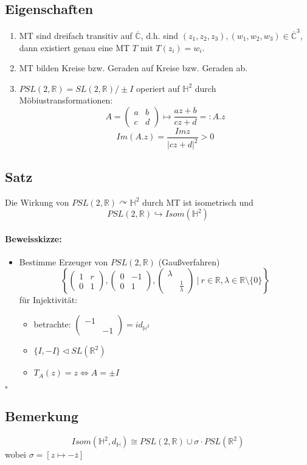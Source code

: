 \documentclass{article}
\newcommand{\R}{\mathbb{R}}
\newcommand{\C}{\mathbb{C}}
\renewcommand{\H}{\mathbb{H}}
\newcommand{\set}[2]{\left\lbrace #1~|~#2 \right\rbrace}
\newcommand{\qed}{$\square$}
\newcommand{\Matrix}[4]{\left(\begin{matrix}
		#1 & #2\\
		#3 & #4
	\end{matrix}\right)}
\begin{document}
\subsection{Eigenschaften}
\begin{enumerate}
	\item MT sind dreifach transitiv auf $\overline{\C}$, d.h. sind $(z_1, z_2, z_3),(w_1, w_2, w_3) \in \overline{\C}^3$, dann existiert genau eine MT $T$ mit $T(z_i) = w_i$.
	\item MT bilden Kreise bzw. Geraden auf Kreise bzw. Geraden ab.
	\item $PSL(2,\R) = SL(2,\R)/\pm I $ operiert auf $\H^2$ durch Möbiustransformationen:
	\[A = \left(\begin{matrix}
	a & b \\
	c & d
	\end{matrix}\right) \longmapsto \frac{az + b }{cz + d}=: A.z\]
	\[Im(A.z) = \frac{Im z}{\left|cz + d\right|^2} > 0 \]
\end{enumerate}

\subsection{Satz}
Die Wirkung von $PSL(2,\R) \curvearrowright \H^2$ durch MT ist isometrisch und 
\[PSL(2,\R) \hookrightarrow Isom(\H^2) \]

\paragraph{Beweisskizze:}
\begin{itemize}
	\item Bestimme Erzeuger von $PSL(2, \R)$ (Gaußverfahren)
	\[\set{\Matrix{1}{r}{0}{1}, \Matrix{0}{-1}{0}{1}, \Matrix{\lambda}{}{}{\frac{1}{\lambda}}}{r \in \R, \lambda \in \R \setminus \{0\}}\]
	für Injektivität:\\
	\begin{itemize}
		\item betrachte: $\Matrix{-1}{}{}{-1} = id_{\H^2}$
		\item $\{I, -I\} \triangleleft SL(\R^2)$
		\item $T_A(z) = z \Longleftrightarrow A = \pm I$
	\end{itemize}	
\end{itemize}
\qed

\subsection{Bemerkung}
\[Isom(\H^2, d_\H) \cong PSL(2,\R) \cup \sigma \cdot PSL(\R^2) \]
wobei $\sigma = [z \mapsto -\overline{z}]$
\end{document}
